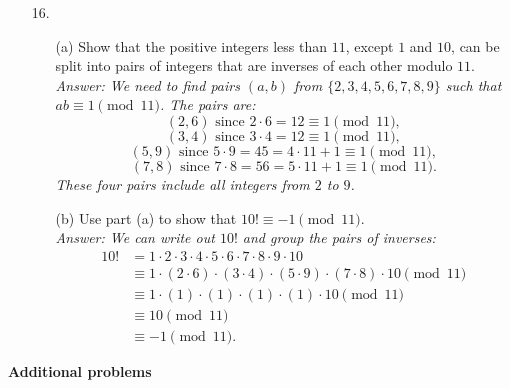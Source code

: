 \documentclass{article}
\begin{document}
\begin{itemize}
    \medskip

    \item[16.]
    \begin{itemize}
        \item[(a)] Show that the positive integers less than $11$, except $1$ and $10$, can be split into pairs of integers that are inverses of each other modulo $11$.
        \medskip\\
        \textit{Answer: We need to find pairs $(a,b)$ from $\{2,3,4,5,6,7,8,9\}$ such that $ab \equiv 1 \pmod{11}$.
        The pairs are:
        \[
        (2,6) \text{ since } 2\cdot6=12 \equiv 1 \pmod{11},
        \]
        \[
        (3,4) \text{ since } 3\cdot4=12 \equiv 1 \pmod{11},
        \]
        \[
        (5,9) \text{ since } 5\cdot9=45=4\cdot11+1 \equiv 1 \pmod{11},
        \]
        \[
        (7,8) \text{ since } 7\cdot8=56=5\cdot11+1 \equiv 1 \pmod{11}.
        \]
        These four pairs include all integers from $2$ to $9$.}

        \medskip

        \item[(b)] Use part (a) to show that $10! \equiv -1 \pmod{11}$.
        \medskip\\
        \textit{Answer: We can write out $10!$ and group the pairs of inverses:
        \[
        \begin{aligned}
            10! &= 1 \cdot 2 \cdot 3 \cdot 4 \cdot 5 \cdot 6 \cdot 7 \cdot 8 \cdot 9 \cdot 10 \\
            &\equiv 1 \cdot (2\cdot6) \cdot (3\cdot4) \cdot (5\cdot9) \cdot (7\cdot8) \cdot 10 \pmod{11} \\
            &\equiv 1 \cdot (1) \cdot (1) \cdot (1) \cdot (1) \cdot 10 \pmod{11} \\
            &\equiv 10 \pmod{11} \\
            &\equiv \boxed{-1} \pmod{11}.
        \end{aligned}
        \]}
    \end{itemize}
\end{itemize}

\newpage

\noindent \textbf{Additional problems}
\end{document}
